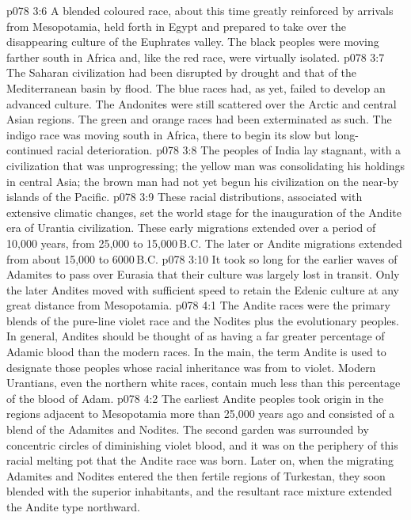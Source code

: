 \vs p078 3:6 A blended coloured race, about this time greatly reinforced by arrivals from Mesopotamia, held forth in Egypt and prepared to take over the disappearing culture of the Euphrates valley. The black peoples were moving farther south in Africa and, like the red race, were virtually isolated.
\vs p078 3:7 The Saharan civilization had been disrupted by drought and that of the Mediterranean basin by flood. The blue races had, as yet, failed to develop an advanced culture. The Andonites were still scattered over the Arctic and central Asian regions. The green and orange races had been exterminated as such. The indigo race was moving south in Africa, there to begin its slow but long\hyp{}continued racial deterioration.
\vs p078 3:8 The peoples of India lay stagnant, with a civilization that was unprogressing; the yellow man was consolidating his holdings in central Asia; the brown man had not yet begun his civilization on the near\hyp{}by islands of the Pacific.
\vs p078 3:9 \pc These racial distributions, associated with extensive climatic changes, set the world stage for the inauguration of the Andite era of Urantia civilization. These early migrations extended over a period of 10,000 years, from 25,000 to 15,000\,B.C. The later or Andite migrations extended from about 15,000 to 6000\,B.C.
\vs p078 3:10 It took so long for the earlier waves of Adamites to pass over Eurasia that their culture was largely lost in transit. Only the later Andites moved with sufficient speed to retain the Edenic culture at any great distance from Mesopotamia.
\vs p078 4:1 The Andite races were the primary blends of the pure\hyp{}line violet race and the Nodites plus the evolutionary peoples. In general, Andites should be thought of as having a far greater percentage of Adamic blood than the modern races. In the main, the term Andite is used to designate those peoples whose racial inheritance was from  to  violet. Modern Urantians, even the northern white races, contain much less than this percentage of the blood of Adam.
\vs p078 4:2 The earliest Andite peoples took origin in the regions adjacent to Mesopotamia more than 25,000 years ago and consisted of a blend of the Adamites and Nodites. The second garden was surrounded by concentric circles of diminishing violet blood, and it was on the periphery of this racial melting pot that the Andite race was born. Later on, when the migrating Adamites and Nodites entered the then fertile regions of Turkestan, they soon blended with the superior inhabitants, and the resultant race mixture extended the Andite type northward.
